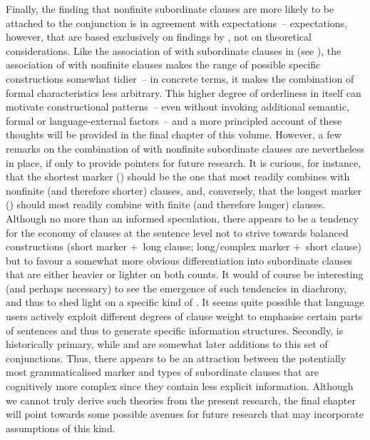 \begin{sloppypar}
Finally, the finding that nonfinite subordinate clauses are more likely to be attached to the conjunction  is in agreement with expectations~– expectations, however, that are based exclusively on findings by \citet{Hilpert2013a}, not on theoretical considerations. Like the association of  with subordinate clauses in  (see ), the association of  with nonfinite clauses makes the range of possible specific constructions somewhat tidier~– in concrete terms, it makes the combination of formal characteristics less arbitrary. This higher degree of orderliness in itself can motivate constructional patterns~– even without invoking additional semantic, formal or language-external factors~– and a more principled account of these thoughts will be provided in the final chapter of this volume. However, a few remarks on the combination of  with nonfinite subordinate clauses are nevertheless in place, if only to provide pointers for future research. It is curious, for instance, that the shortest marker () should be the one that most readily combines with nonfinite (and therefore shorter) clauses, and, conversely, that the longest marker () should most readily combine with finite (and therefore longer) clauses. Although no more than an informed speculation, there appears to be a tendency for the economy of clauses at the sentence level not to strive towards balanced constructions (short marker +~long clause; long/complex marker +~short clause) but to favour a somewhat more obvious differentiation into subordinate clauses that are either heavier or lighter on both counts. It would of course be interesting (and perhaps necessary) to see the emergence of such tendencies in diachrony, and thus to shed light on a specific kind of . It seems quite possible that language users actively exploit different degrees of clause weight to emphasise certain parts of sentences and thus to generate specific information structures. Secondly,  is historically primary, while  and  are somewhat later additions to this set of conjunctions. Thus, there appears to be an attraction between the potentially most grammaticalised marker and types of subordinate clauses that are cognitively more complex since they contain less explicit information. Although we cannot truly derive such theories from the present research, the final chapter will point towards some possible avenues for future research that may incorporate assumptions of this kind.
\end{sloppypar}
